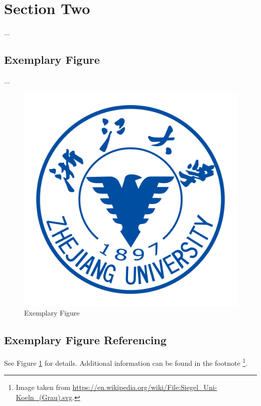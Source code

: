 \clearpage
\section{Section Two}
\label{sec:Section_Name}
...
\subsection{Exemplary Figure}
\label{subsec:Section_Name/fig}
...
\begin{figure}[htbp]
    \centering
    \includegraphics[width=.5\linewidth]{./Figures/ZJU_LOGO.png}
    \caption{Exemplary Figure}
    \label{fig:UoC}
\end{figure}


\subsection{Exemplary Figure Referencing}
\label{subsec:Section_Name/fig_rfs}

See Figure \ref{fig:UoC} for details. Additional information can be
found in the footnote \footnote{Image taken from \url{https://en.wikipedia.org/wiki/File:Siegel_Uni-Koeln_(Grau).svg}.}.
